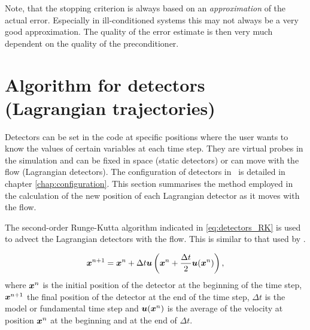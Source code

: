 Note, that the stopping criterion is always based on an \emph{approximation}
of the actual error. Especially in ill-conditioned systems this may not
always be a very good approximation. The quality of the error estimate is
then very much dependent on the quality of the preconditioner.

\section{Algorithm for detectors (Lagrangian trajectories)}
 
Detectors can be set in the code at specific positions where the user wants
to know the values of certain variables at each time step. They are virtual
probes in the simulation and can be fixed in space (static detectors) or can
move with the flow (Lagrangian detectors). The configuration of detectors in
\fluidity\ is detailed in chapter
\ref{chap:configuration}. This section summarises the method
employed in the calculation of the new position of each Lagrangian detector
as it moves with the flow.

The second-order Runge-Kutta algorithm indicated in \eqref{eq:detectors_RK}
is used to advect the Lagrangian detectors with the flow. This is similar to
that used by \cite{walters2007}.


\begin{equation}\label{eq:detectors_RK}
{\mbox{\boldmath$x$}}^{n+1} =  {\mbox{\boldmath$x$}}^{n} + \Delta t {\mbox{\boldmath$u$}}\left({\mbox{\boldmath$x$}}^{n} + \frac{\Delta t }{2} {\mbox{\boldmath$u$}}({\mbox{\boldmath$x$}}^{n})\right),
\end{equation}
where ${\mbox{\boldmath$x$}}^{n}$ is the initial position of the detector at the beginning of the time step, ${\mbox{\boldmath$x$}}^{n+1}$ the final position of the detector at the end of the time step, $\Delta t$ is the model or fundamental time step and ${\mbox{\boldmath$u$}}({\mbox{\boldmath$x$}}^{n})$ is the average of the velocity at position ${\mbox{\boldmath$x$}}^{n}$ at the beginning and at the end of $\Delta t$.

